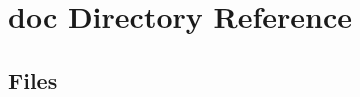 \section{doc Directory Reference}
\label{dir_e68e8157741866f444e17edd764ebbae}
\subsection*{Files}
\begin{DoxyCompactItemize}
\end{DoxyCompactItemize}
